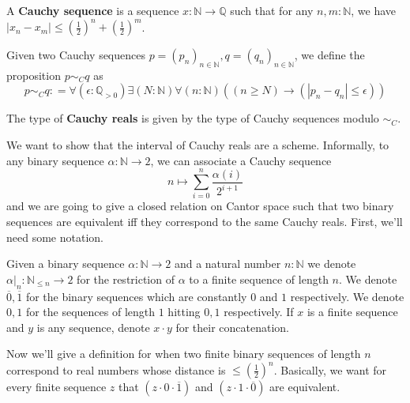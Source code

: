 
\begin{definition}
  A \textbf{Cauchy sequence} is a sequence $x : \mathbb N \to \mathbb Q$ such that
  for any $n,m:\mathbb N$, we have %
$|x_n-x_m| \leq (\frac12)^n + (\frac12)^m$. 
\end{definition}

\begin{definition}
Given two Cauchy sequences $p = (p_n)_{n\in\mathbb N}, q=(q_n)_{n\in\mathbb N}$, 
we define the proposition $p \sim_C  q$ as 
\begin{equation}
  p \sim_C q : = \forall (\epsilon : \mathbb Q_{>0} )\exists ( N :\mathbb N) \forall (n : \mathbb N) ((n \geq N) \to 
  (| p_n - q_n| \leq  \epsilon))
\end{equation}
\end{definition}

\begin{definition}
  The type of \textbf{Cauchy reals} is given by 
  the type of Cauchy sequences modulo $\sim_C$.
\end{definition}


We want to show that the interval of Cauchy reals are a scheme. 
Informally, to any binary sequence $\alpha : \mathbb N \to 2$, 
we can associate a Cauchy sequence 
\begin{equation}n\mapsto \sum\limits_{i = 0 }^n \frac {\alpha(i)}{2^{i+1}}\end{equation}
and we are going to give a closed relation on Cantor space such that 
two binary sequences are equivalent iff they correspond to the same Cauchy reals. 
%
First, we'll need some notation.
\begin{definition}
Given a binary sequence $\alpha:\mathbb N \to 2$ and a natural number $n : \mathbb N$  
we denote $\alpha|_n: \mathbb N_{\leq n} \to 2$ for the 
restriction of $\alpha$ to a finite sequence of length $n$. 
We denote $\overline 0, \overline 1$ for the binary sequences which are constantly $0$ and $1$ respectively. 
We denote $0,1$ for the sequences of length $1$ hitting $0,1$ respectively. 
If $x$ is a finite sequence and $y$ is any sequence, denote $x\cdot y$ for their concatenation. 
\end{definition} 
Now we'll give a definition for when two finite binary sequences of length $n$ correspond 
to real numbers whose distance is $\leq (\frac12)^n$.
Basically, we want for every finite sequence $z$ that 
$(z \cdot 0 \cdot \overline 1)$ and  $(z \cdot 1 \cdot \overline 0)$ are equivalent. 

